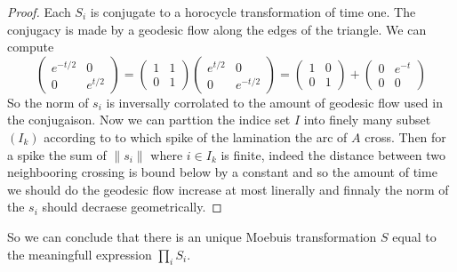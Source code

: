 \begin{proof}
Each $S_i$ is conjugate to a horocycle transformation of time one. The conjugacy is made by a geodesic flow along the edges of the triangle. We can compute \[
\begin{pmatrix} e^{-t/2} & 0 \\ 0 & e^{t/2} \end{pmatrix} = \begin{pmatrix} 1 & 1 \\ 0 & 1 \end{pmatrix} \begin{pmatrix} e^{t/2} & 0 \\ 0 & e^{-t/2} \end{pmatrix} = \begin{pmatrix} 1 & 0 \\ 0 & 1 \end{pmatrix}+ \begin{pmatrix} 0 & e^{-t} \\ 0 & 0 \end{pmatrix}
\]
So the norm of $s_i$ is inversally corrolated to the amount of geodesic flow used in the conjugaison.
Now we can parttion the indice set $I$ into finely many subset $(I_k)$ according to to which spike of the lamination the arc of $A$ cross.
Then for a spike the sum of $\|s_i \|$ where $i \in I_k$ is finite, indeed the distance between two neighbooring crossing is bound below by a constant and so the amount of time we should do the geodesic flow increase at most linerally and finnaly the norm of the $s_i$ should decraese geometrically.
\end{proof}

So we can conclude that there is an unique Moebuis transformation $S$ equal to the meaningfull expression $\prod_i S_i$.
